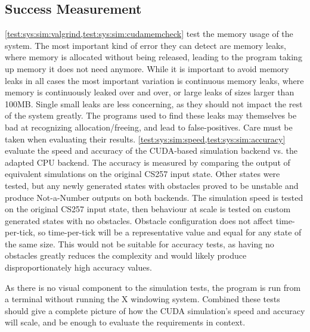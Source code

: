 \subsection{Success Measurement}\label{sec:Testing:SuccessMeasurement}
\cref{test:sys:sim:valgrind,test:sys:sim:cudamemcheck} test the memory usage of the system.
The most important kind of error they can detect are memory leaks, where memory is allocated without being released, leading to the program taking up memory it does not need anymore.
While it is important to avoid memory leaks in all cases the most important variation is continuous memory leaks, where memory is continuously leaked over and over, or large leaks of sizes larger than 100MB.
Single small leaks are less concerning, as they should not impact the rest of the system greatly.
The programs used to find these leaks may themselves be bad at recognizing allocation/freeing\cite{ValgrindProblemsBlog}, and lead to false-positives.
Care must be taken when evaluating their results.
\cref{test:sys:sim:speed,test:sys:sim:accuracy} evaluate the speed and accuracy of the CUDA-based simulation backend vs. the adapted CPU backend.
The accuracy is measured by comparing the output of equivalent simulations on the original CS257 input state.
Other states were tested, but any newly generated states with obstacles proved to be unstable and produce Not-a-Number outputs on both backends.
The simulation speed is tested on the original CS257 input state, then behaviour at scale is tested on custom generated states with no obstacles.
Obstacle configuration does not affect time-per-tick, so time-per-tick will be a representative value and equal for any state of the same size.
This would not be suitable for accuracy tests, as having no obstacles greatly reduces the complexity and would likely produce disproportionately high accuracy values.

As there is no visual component to the simulation tests, the program is run from a terminal without running the X windowing system.
Combined these tests should give a complete picture of how the CUDA simulation's speed and accuracy will scale, and be enough to evaluate the requirements in context.

